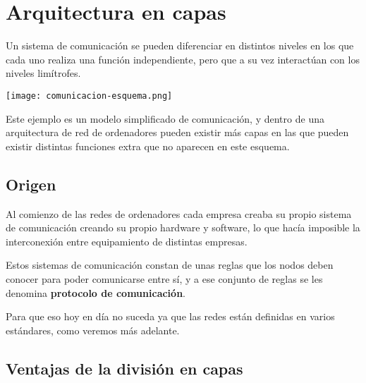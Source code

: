 \chapter{Arquitectura en capas}
Un sistema de comunicación se pueden diferenciar en distintos niveles en los que cada uno realiza una función independiente, pero que a su vez interactúan con los niveles limítrofes.

\begin{center}
    \vspace{-10pt}
    \texttt{[image: comunicacion-esquema.png]}
    \vspace{-10pt}
\end{center}

Este ejemplo es un modelo simplificado de comunicación, y dentro de una arquitectura de red de ordenadores pueden existir más capas en las que pueden existir distintas funciones extra que no aparecen en este esquema.

\section{Origen}

Al comienzo de las redes de ordenadores cada empresa creaba su propio sistema de comunicación creando su propio hardware y software, lo que hacía imposible la interconexión entre equipamiento de distintas empresas.

Estos sistemas de comunicación constan de unas reglas que los nodos deben conocer para poder comunicarse entre sí, y a ese conjunto de reglas se les denomina \textbf{protocolo de comunicación}.


Para que eso hoy en día no suceda ya que las redes están definidas en varios estándares, como veremos más adelante.



\section{Ventajas de la división en capas}

